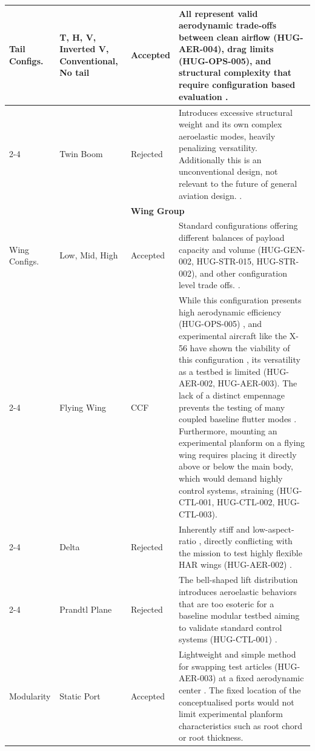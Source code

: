 \begin{longtable}{|p{1.6cm}|p{2.3cm}|p{1.6cm}|p{9.5cm}|}
\hline
Tail Configs. & T, H, V, Inverted V, Conventional, No tail & Accepted & All represent valid aerodynamic trade-offs between clean airflow (HUG-AER-004), drag limits (HUG-OPS-005), and structural complexity that require configuration based evaluation \cite{Vos, raymer1992aircraft}. \\
\cline{2-4}
\multicolumn{1}{|l|}{} & Twin Boom & Rejected & Introduces excessive structural weight and its own complex aeroelastic modes, heavily penalizing versatility. Additionally this is an unconventional design, not relevant to the future of general aviation design. \cite{raymer1992aircraft}. \\
\hline

\multicolumn{4}{|c|}{\textbf{Wing Group}} \\
\hline
Wing Configs. & Low, Mid, High & Accepted & Standard configurations offering different balances of payload capacity and volume (HUG-GEN-002, HUG-STR-015, HUG-STR-002), and other configuration level trade offs.  \cite{raymer1992aircraft}. \\
\cline{2-4}
\multicolumn{1}{|l|}{} & Flying Wing & CCF & While this configuration presents high aerodynamic efficiency (HUG-OPS-005) \cite{raymer1992aircraft}, and experimental aircraft like the X-56 have shown the viability of this configuration \cite{Castro2026}, its versatility as a testbed is limited (HUG-AER-002, HUG-AER-003). The lack of a distinct empennage prevents the testing of many coupled baseline flutter modes \cite{livne}. Furthermore, mounting an experimental planform on a flying wing requires placing it directly above or below the main body, which would demand highly control systems, straining (HUG-CTL-001, HUG-CTL-002, HUG-CTL-003). \\
\cline{2-4}
\multicolumn{1}{|l|}{} & Delta & Rejected & Inherently stiff and low-aspect-ratio \cite{raymer1992aircraft}, directly conflicting with the mission to test highly flexible HAR wings (HUG-AER-002) \cite{Ma2024}. \\
\cline{2-4}
\multicolumn{1}{|l|}{} & Prandtl Plane & Rejected & The bell-shaped lift distribution introduces aeroelastic behaviors that are too esoteric for a baseline modular testbed aiming to validate standard control systems (HUG-CTL-001) \cite{Bowers2016}. \\
\hline
Modularity & Static Port & Accepted & Lightweight and simple method for swapping test articles (HUG-AER-003) at a fixed aerodynamic center \cite{raymer1992aircraft}. The fixed location of the conceptualised ports would not limit experimental planform characteristics such as root chord or root thickness.\\

\end{longtable}
